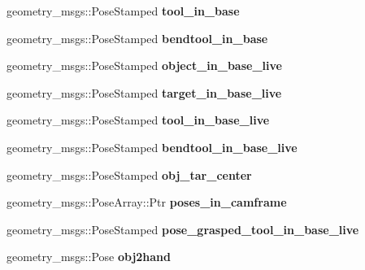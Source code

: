 \begin{DoxyCompactItemize}
\mbox{\label{structManipulate_aeaa275079464acc0a896ca44fab5e294}} 
geometry\+\_\+msgs\+::\+Pose\+Stamped {\bfseries tool\+\_\+in\+\_\+base}
\item 
\mbox{\label{structManipulate_a3fa34874a51a92ec736de389db271e9a}} 
geometry\+\_\+msgs\+::\+Pose\+Stamped {\bfseries bendtool\+\_\+in\+\_\+base}
\item 
\mbox{\label{structManipulate_a4fd4758c308f1ba852b3804f207b2fee}} 
geometry\+\_\+msgs\+::\+Pose\+Stamped {\bfseries object\+\_\+in\+\_\+base\+\_\+live}
\item 
\mbox{\label{structManipulate_a253469a9ad3745a40423feae04de6ee4}} 
geometry\+\_\+msgs\+::\+Pose\+Stamped {\bfseries target\+\_\+in\+\_\+base\+\_\+live}
\item 
\mbox{\label{structManipulate_aa1918d02dcfc7a27adaf2dd01deb30c5}} 
geometry\+\_\+msgs\+::\+Pose\+Stamped {\bfseries tool\+\_\+in\+\_\+base\+\_\+live}
\item 
\mbox{\label{structManipulate_a2368c77d601e506ef0f0f9089e7c003d}} 
geometry\+\_\+msgs\+::\+Pose\+Stamped {\bfseries bendtool\+\_\+in\+\_\+base\+\_\+live}
\item 
\mbox{\label{structManipulate_a6cb182295e57cadd6aacb9bb95f9b549}} 
geometry\+\_\+msgs\+::\+Pose\+Stamped {\bfseries obj\+\_\+tar\+\_\+center}
\item 
\mbox{\label{structManipulate_a2c15d66bbcc9bcb285c2c2266fbd75e1}} 
geometry\+\_\+msgs\+::\+Pose\+Array\+::\+Ptr {\bfseries poses\+\_\+in\+\_\+camframe}
\item 
\mbox{\label{structManipulate_aadd6e26eee051db51095f112042e7b86}} 
geometry\+\_\+msgs\+::\+Pose\+Stamped {\bfseries pose\+\_\+grasped\+\_\+tool\+\_\+in\+\_\+base\+\_\+live}
\item 
\mbox{\label{structManipulate_a14032954d8fd236c1c227009fe02da07}} 
geometry\+\_\+msgs\+::\+Pose {\bfseries obj2hand}
\item 
\mbox{\label{structManipulate_a1752fad275ec82572cedebf05773af7e}} 

\end{DoxyCompactItemize}
